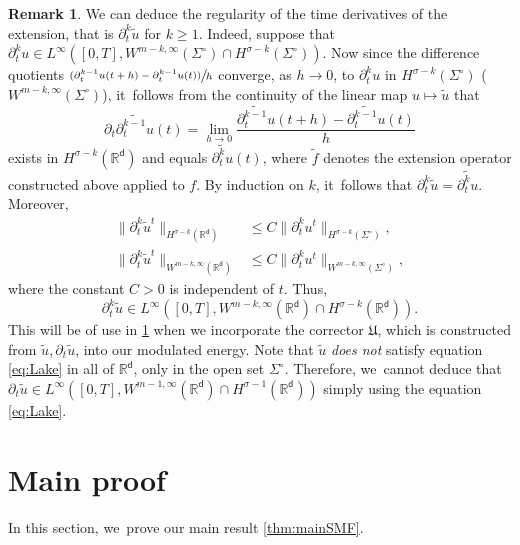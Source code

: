 \documentclass[10pt]{amsart}
\newcommand{\psfrac}[2]{\sfrac{(#1)}{#2}}
\newcommand{\Sigmacirc}{\Sigma^\circ}
\theoremstyle{plain}
\theoremstyle{definition}
\newtheorem{remark}[thm]{Remark}
\newcommand{\R}{{\mathbb{R}}}
\let\p\partial
\let\tl\tilde
\newcommand{\Uu}{\mathfrak{U}}
\renewcommand{\d}{\mathsf{d}}
\begin{document}
\skpt
\begin{remark}\label{rem:ptuext}
We can deduce the regularity of the time derivatives of the extension, that is $\p_t^k\tl u$ for $k\ge 1$. Indeed, suppose that $\p_t^k u \in L^\infty([0,T], W^{m-k,\infty}(\Sigmacirc)\cap H^{\sigma -k}(\Sigmacirc))$.
Now since the difference quotients $\psfrac{\p_t^{k-1}u(t+h) - \p_t^{k-1}u(t)}{h}$ converge, as $h\to 0$, to $\p_t^k u$ in $H^{\sigma-k}(\Sigmacirc)$ (\resp $W^{m-k,\infty}(\Sigmacirc)$), it~follows from the continuity of the linear map $u\mapsto \tl u$ that\vspace*{-5pt}
\begin{equation*}
\p_t\widetilde{\p_t^{k-1} u}(t)= \lim_{h\to 0} \frac{\widetilde{\p_t^{k-1} u}(t+h) - \widetilde{\p_t^{k-1} u}(t)}{h}\end{equation*}
exists in $H^{\sigma-k}(\R^\d)$ and equals $\widetilde{\p_t^k u}(t)$,
where $\widetilde{f}$ denotes the extension operator constructed above applied to $f$. By induction on $k$, it~follows that $\p_t^k\tl{u} = \widetilde{\p_t^k u}$. Moreover,\vspace*{-3pt}
\begin{align*}
\|\p_t^k\tl u^t\|_{H^{\sigma-k}(\R^\d)} &\leq C\|\p_t^k u^t\|_{H^{\sigma-k}(\Sigmacirc)},\\
\|\p_t^k \tl{u}^t\|_{W^{m-k,\infty}(\R^\d)} &\le C\|\p_t^k u^t\|_{W^{m-k,\infty}(\Sigmacirc)},
\end{align*}
where the constant $C>0$ is independent of $t$. Thus,\vspace*{-3pt}
\begin{equation}
\p_t^k\tl u\in L^\infty([0,T], W^{m-k,\infty}(\R^\d)\cap H^{\sigma-k}(\R^\d)).
\end{equation}
This will be of use in \cref{sec:MP} when we incorporate the corrector $\Uu$, which is constructed from $\tl u, \p_t\tl u$, into our modulated energy. Note that $\tl u$ \emph{does not} satisfy equation \eqref{eq:Lake} in all of $\R^\d$, only in the open set $\Sigmacirc$. Therefore, we~cannot deduce that $\p_t\tl u\in L^\infty([0,T], W^{m-1,\infty}(\R^\d) \cap H^{\sigma-1}(\R^\d))$ simply using the equation \eqref{eq:Lake}.
\end{remark}

\section{Main proof}\label{sec:MP}

In this section, we~prove our main result \cref{thm:mainSMF}.
\end{document}
